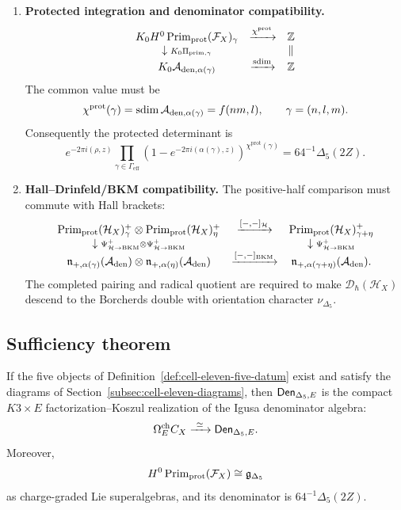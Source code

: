 \begin{enumerate}
\item \textbf{Protected integration and denominator compatibility.}
$$
\begin{array}{ccc}
K_0 H^0\operatorname{Prim}_{\mathrm{prot}}(\mathcal F_X)_\gamma
& \xrightarrow{\chi^{\mathrm{prot}}}
& \mathbb Z\\
\downarrow{\scriptstyle K_0\Pi_{\mathrm{prim},\gamma}}
&&
\Vert\\
K_0\mathcal A_{\mathrm{den},\alpha(\gamma)}
& \xrightarrow{\operatorname{sdim}}
& \mathbb Z
\end{array}
$$
The common value must be
$$
\chi^{\mathrm{prot}}(\gamma)
=\operatorname{sdim}\mathcal A_{\mathrm{den},\alpha(\gamma)}
=f(nm,l),
\qquad \gamma=(n,l,m).
$$
Consequently the protected determinant is
$$
e^{-2\pi i(\rho,z)}
\prod_{\gamma\in\Gamma_{\mathrm{eff}}}
\left(1-e^{-2\pi i(\alpha(\gamma),z)}\right)^{
\chi^{\mathrm{prot}}(\gamma)}
=64^{-1}\Delta_5(2Z).
$$

\item \textbf{Hall--Drinfeld/BKM compatibility.}
The positive-half comparison must commute with Hall brackets:
$$
\begin{array}{ccc}
\operatorname{Prim}_{\mathrm{prot}}(\mathcal H_X)^+_\gamma
\otimes
\operatorname{Prim}_{\mathrm{prot}}(\mathcal H_X)^+_\eta
& \xrightarrow{[-,-]_{\mathcal H}}
& \operatorname{Prim}_{\mathrm{prot}}(\mathcal H_X)^+_{\gamma+\eta}\\
\downarrow{\scriptstyle \Psi^+_{\mathcal H\to\mathrm{BKM}}\otimes
\Psi^+_{\mathcal H\to\mathrm{BKM}}}
&&
\downarrow{\scriptstyle \Psi^+_{\mathcal H\to\mathrm{BKM}}}\\
\mathfrak n_{+,\alpha(\gamma)}(\mathcal A_{\mathrm{den}})
\otimes
\mathfrak n_{+,\alpha(\eta)}(\mathcal A_{\mathrm{den}})
& \xrightarrow{[-,-]_{\mathrm{BKM}}}
& \mathfrak n_{+,\alpha(\gamma+\eta)}(\mathcal A_{\mathrm{den}}).
\end{array}
$$
The completed pairing and radical quotient are required to make
\(\mathcal D_\hbar(\mathcal H_X)\) descend to the Borcherds double with
orientation character \(\nu_{\Delta_5}\).
\end{enumerate}

\subsection{Sufficiency theorem}
\label{subsec:cell-eleven-sufficiency}

\begin{theorem}
\label{thm:cell-eleven-dossier-suffices}
If the five objects of Definition~\ref{def:cell-eleven-five-datum}
exist and satisfy the diagrams of
Section~\ref{subsec:cell-eleven-diagrams}, then
\(\mathsf{Den}_{\Delta_5,E}\) is the compact \(K3\times E\)
factorization--Koszul realization of the Igusa denominator algebra:
$$
\Omegach_E C_X\xrightarrow{\ \simeq\ }\Den_{\Delta_5,E}.
$$
Moreover,
$$
H^0\operatorname{Prim}_{\mathrm{prot}}(\mathcal F_X)
\cong
\mathfrak g_{\Delta_5}
$$
as charge-graded Lie superalgebras, and its denominator is
\(64^{-1}\Delta_5(2Z)\).
\end{theorem}

